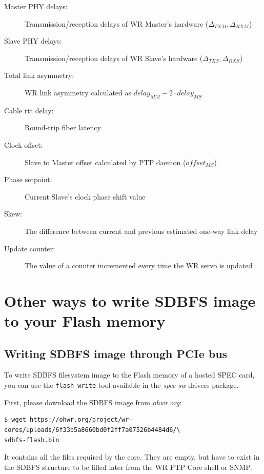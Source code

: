 \documentclass[a4paper, 12pt]{article}
\renewcommand{\_}{\underscore\allowbreak}
\begin{document}
\begin{description}
\item[Master PHY delays:] Transmission/reception delays of WR
    Master's hardware ($\Delta_{TXM}, \Delta_{RXM}$)

\item[Slave PHY delays:] Transmission/reception delays of WR Slave's
    hardware ($\Delta_{TXS}, \Delta_{RXS}$)

\item[Total link asymmetry:] WR link asymmetry calculated as
    $delay_{MM} - 2 \cdot delay_{MS}$

\item[Cable rtt delay:] Round-trip fiber latency

\item[Clock offset:] Slave to Master offset calculated by PTP daemon
  ($ offset_{MS} $)

\item[Phase setpoint:] Current Slave's clock phase shift value

\item[Skew:] The difference between current and previous estimated
    one-way link delay

\item[Update counter:] The value of a counter incremented every time
    the WR servo is updated

\end{description}
\renewcommand\arraystretch{1}


\clearpage
\section{Other ways to write SDBFS image to your Flash memory}
\label{appendix:writing_sdbfs}

\subsection{Writing SDBFS image through PCIe bus}
To write SDBFS filesystem image to the Flash memory of a hosted SPEC card, you
can use the \texttt{flash-write} tool available in the \emph{spec-sw} drivers
package.

First, please download the SDBFS image from \textit{ohwr.org}:
\begin{lstlisting}
$ wget https://ohwr.org/project/wr-cores/uploads/6f33b5a8660bd0f2ff7a07526b4484d6/\
sdbfs-flash.bin
\end{lstlisting}
It contains all the files required by the core. They are empty, but have to
exist in the SDBFS structure to be filled later from the WR PTP Core shell or
SNMP.\\
\end{document}
